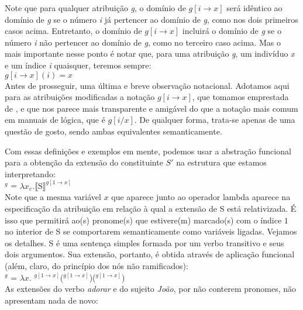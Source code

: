 \n Note que para qualquer atribuição \textit{g}, o domínio de
$g[i \rightarrow x]$ será idêntico ao domínio de \textit{g} se o
número \textit{i} já pertencer ao domínio de \textit{g}, como nos dois primeiros casos acima.
Entretanto, o domínio de $g[i \rightarrow x]$ incluirá o domínio de \textit{g} se o número \textit{i} não
pertencer ao domínio de \textit{g}, como no terceiro caso acima. Mas o mais importante nesse ponto é notar que, para uma atribuição \textit{g}, um indivíduo \textit{x} e um índice \textit{i} quaisquer, teremos sempre:\\

\n $g[i \rightarrow x](i) = x$\\

\n Antes de prosseguir, uma última e breve observação notacional. Adotamos aqui para as atribuições modificadas a notação $g[i \rightarrow x]$, que tomamos emprestada de \cite{buring05}, e que nos parece mais transparente e amigável do que a notação mais comum em manuais de lógica, que é $g[i/x]$. De qualquer forma, trata-se apenas de uma questão de gosto, sendo ambas equivalentes semanticamente.

Com essas definições e exemplos em mente, podemos usar
a abstração funcional para a obtenção da extensão do
constituinte $S'$ na estrutura que estamos
interpretando:\\

\n{}$^{g}$ = $\lambda x_{e}. \llbracket \text{S}
\rrbracket^{g[1 \rightarrow x]}$\\

\n Note que a mesma variável $x$ que aparece junto ao operador lambda aparece na especificação da atribuição em relação à qual a extensão de S está relativizada. É isso que permitirá ao(s) pronome(s) que estivere(m) marcado(s) com o índice $1$ no interior de S se comportarem semanticamente como variáveis ligadas. Vejamos os detalhes. S é uma sentença simples formada por um verbo transitivo e seus dois argumentos. Sua extensão, portanto, é obtida através de aplicação funcional (além, claro, do princípio dos nós não ramificados):\\

\n  {}$^{g}$ = $\lambda x.$ $^{g[1 \rightarrow x]}$($^{g[1 \rightarrow x]}$)($^{g[1 \rightarrow x]}$)\\

\n As extensões do verbo \textit{adorar} e do sujeito \textit{João}, por não conterem pronomes, não apresentam nada de novo:\\


